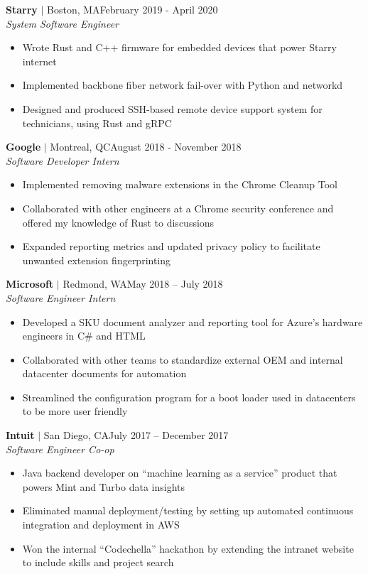 \documentclass[overlapped,line]{res}
\begin{document}
\begin{resume}
\textbf{Starry} $|$ Boston, MA\hfill February 2019 - April 2020\\
{\sl System Software Engineer}
\begin{itemize} \itemsep -2pt
    \item Wrote Rust and C++ firmware for embedded devices that power Starry internet
    \item Implemented backbone fiber network fail-over with Python and networkd
    \item Designed and produced SSH-based remote device support system for technicians, using Rust and gRPC
\end{itemize}

\textbf{Google} $|$ Montreal, QC\hfill August 2018 - November 2018\\
{\sl Software Developer Intern}
\begin{itemize} \itemsep -2pt
	\item Implemented removing malware extensions in the Chrome Cleanup
		Tool%
    \item Collaborated with other engineers at a Chrome security conference and
      offered my knowledge of Rust to discussions
    \item Expanded reporting metrics and updated privacy policy to facilitate unwanted extension fingerprinting
\end{itemize}

\textbf{Microsoft} $|$ Redmond, WA\hfill May 2018 \--- July 2018\\
{\sl Software Engineer Intern}
\begin{itemize} \itemsep -2pt
	\item Developed a SKU document analyzer and reporting tool for Azure's hardware engineers in C\# and HTML
	\item Collaborated with other teams to standardize external OEM and internal datacenter documents for automation
	\item Streamlined the configuration program for a boot loader used in datacenters to be more user friendly
\end{itemize}

\textbf{Intuit} $|$ San Diego, CA\hfill July 2017 \--- December 2017\\
{\sl Software Engineer Co-op}
\begin{itemize} \itemsep -2pt
	\item Java backend developer on ``machine learning as a service'' product that powers Mint and Turbo data insights
	\item Eliminated manual deployment/testing by setting up automated
      continuous integration and deployment in AWS
	\item Won the internal ``Codechella'' hackathon by extending the intranet website to include skills and project search
\end{itemize}


\end{resume}
\end{document}
